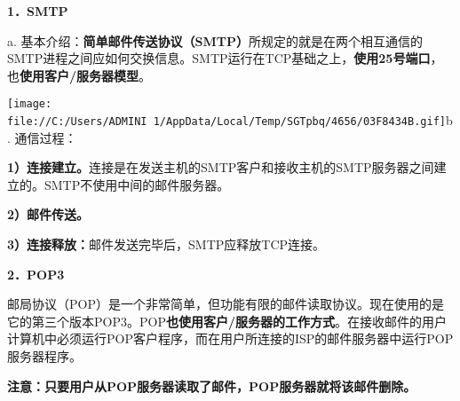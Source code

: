 \textbf{{1．SMTP}}

a.
基本介绍：\textbf{简单邮件传送协议（SMTP）}所规定的就是在两个相互通信的SMTP进程之间应如何交换信息。SMTP运行在TCP基础之上，{\textbf{使用25号端口}}，也\textbf{{使用客户/服务器模型}}。

\texttt{[image: file://C:/Users/ADMINI~1/AppData/Local/Temp/SGTpbq/4656/03F8434B.gif]}b.
通信过程：

\textbf{1）连接建立。}连接是在发送主机的SMTP客户和接收主机的SMTP服务器之间建立的。SMTP不使用中间的邮件服务器。

\textbf{2）邮件传送。}

\textbf{3）连接释放：}邮件发送完毕后，SMTP应释放TCP连接。

\textbf{{2．POP3}}

邮局协议（POP）是一个非常简单，但功能有限的邮件读取协议。现在使用的是它的第三个版本POP3。POP\textbf{{也使用客户/服务器的工作方式}}。在接收邮件的用户计算机中必须运行POP客户程序，而在用户所连接的ISP的邮件服务器中运行POP服务器程序。

\textbf{{注意：}只要用户从POP服务器读取了邮件，POP服务器就将该邮件删除。}
